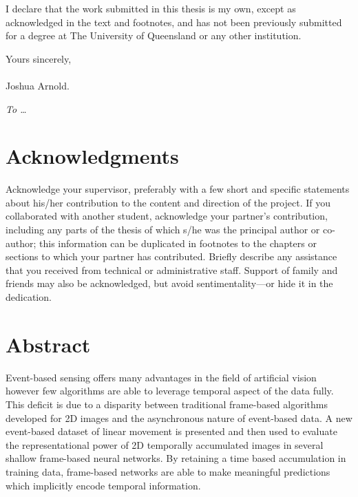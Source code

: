 \documentclass[12pt,openany,a4paper]{book}
\renewcommand{\baselinestretch}{1.2}	%
\begin{document}
I declare that the work submitted in this thesis is my own, except as
acknowledged in the text and footnotes, and has not been previously
submitted for a degree at The University of Queensland or any other
institution.

\begin{flushright}
	Yours sincerely,\\
	\medskip
	\emph{}\\
	\medskip
	Joshua Arnold.
\end{flushright}

\cleardoublepage

\vspace*{70mm}
\begin{center}
\renewcommand{\baselinestretch}{1.0}
\sl
	To \ldots
\end{center}

\chapter{Acknowledgments}

Acknowledge your supervisor, preferably with a few short and specific
statements about his/her contribution to the content and direction of
the project.  If you collaborated with another student, acknowledge
your partner's contribution, including any parts of the thesis of
which s/he was the principal author or co-author; this information can
be duplicated in footnotes to the chapters or sections to which your
partner has contributed.  Briefly describe any assistance that you
received from technical or administrative staff.  Support of family
and friends may also be acknowledged, but avoid sentimentality---or
hide it in the dedication.

\cleardoublepage

\chapter{Abstract}

Event-based sensing offers many advantages in the field of artificial vision however few algorithms are able to leverage temporal aspect of the data fully. 
This deficit is due to a disparity between traditional frame-based algorithms developed for 2D images and the asynchronous nature of event-based data. 
A new event-based dataset of linear movement is presented and then used to evaluate the representational power of 2D temporally accumulated images in several shallow frame-based neural networks. 
By retaining a time based accumulation in training data, frame-based networks are able to make meaningful predictions which implicitly encode temporal information. 
\end{document}
